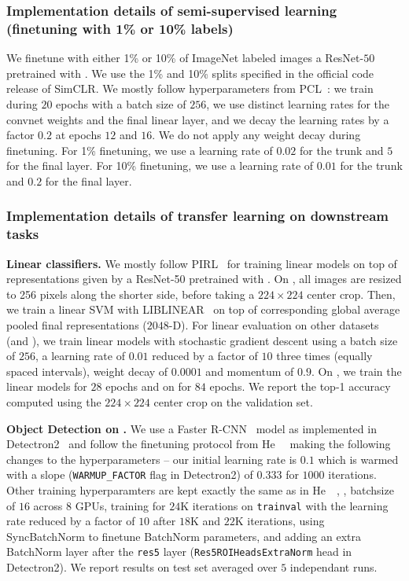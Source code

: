 \subsubsection{Implementation details of semi-supervised learning (finetuning with 1\% or 10\% labels)}
We finetune with either 1\% or 10\% of ImageNet labeled images a ResNet-$50$ pretrained with \OURS.
We use the 1\% and 10\% splits specified in the official code release of SimCLR.
We mostly follow hyperparameters from PCL~\cite{li2020prototypical}: we train during $20$ epochs with a batch size of $256$, we use distinct learning rates for the convnet weights and the final linear layer, and we decay the learning rates by a factor $0.2$ at epochs $12$ and $16$.
We do not apply any weight decay during finetuning.
For 1\% finetuning, we use a learning rate of $0.02$ for the trunk and $5$ for the final layer.
For 10\% finetuning, we use a learning rate of $0.01$ for the trunk and $0.2$ for the final layer.

\subsubsection{Implementation details of transfer learning on downstream tasks}
\par \noindent \textbf{Linear classifiers.} We mostly follow PIRL~\cite{misra2019self} for training linear models on top of representations given by a ResNet-50 pretrained with \OURS.
On \VOCseven, all images are resized to 256 pixels along the shorter side, before taking a $224 \times 224$ center crop.
Then, we train a linear SVM with LIBLINEAR~\cite{fan2008liblinear} on top of corresponding global average pooled final representations ($2048$-D).
For linear evaluation on other datasets (\Places and \iNat), we train linear models with stochastic gradient descent using a batch size of $256$, a learning rate of $0.01$ reduced by a factor of $10$ three times (equally spaced intervals), weight decay of $0.0001$ and momentum of $0.9$.
On \Places, we train the linear models for $28$ epochs and on \iNat for $84$ epochs. We report the top-1 accuracy computed using the $224 \times 224$ center crop on the validation set.

\par \noindent \textbf{Object Detection on \VOCseventwelve.} We use a Faster R-CNN~\cite{ren2015faster} model as implemented in Detectron2~\cite{wu2019detectron2} and follow the finetuning protocol from He~\etal~\cite{he2019momentum} making the following changes to the hyperparameters -- our initial learning rate is $0.1$ which is warmed with a slope (\texttt{WARMUP\_FACTOR} flag in Detectron2) of $0.333$ for $1000$ iterations.
Other training hyperparamters are kept exactly the same as in He~\etal~\cite{he2019momentum}, \ie, batchsize of $16$ across $8$ GPUs, training for $24$K iterations on \VOCseventwelve \texttt{trainval} with the learning rate reduced by a factor of $10$ after $18$K and $22$K iterations, using SyncBatchNorm to finetune BatchNorm parameters, and adding an extra BatchNorm layer after the \texttt{res5} layer (\texttt{Res5ROIHeadsExtraNorm} head in Detectron2).
We report results on \VOCseven test set averaged over $5$ independant runs.

